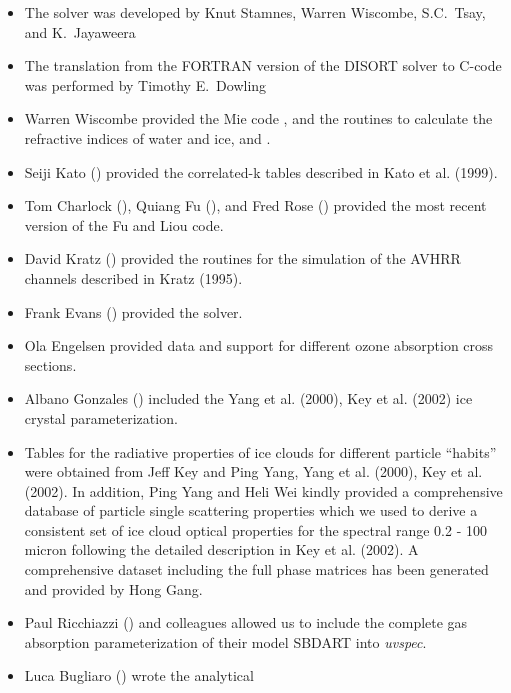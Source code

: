 \begin{itemize}
\item The  solver was developed by Knut Stamnes, Warren Wiscombe, 
  S.C.~Tsay, and K.~Jayaweera
\item The translation from the FORTRAN version of the DISORT solver to C-code was performed by Timothy E.~Dowling
\item Warren Wiscombe provided the Mie code , and the routines to calculate
  the refractive indices of water and ice,  and .
\item Seiji Kato () provided the 
  correlated-k tables described in Kato et al. (1999).
\item Tom Charlock (), Quiang Fu 
  (), 
  and Fred Rose () provided the most recent version 
  of the Fu and Liou code.
\item David Kratz () provided the routines 
  for the simulation of the AVHRR channels described in 
  Kratz (1995).
\item Frank Evans () provided the
   solver.
\item Ola Engelsen provided data and support for different ozone 
absorption cross sections.
\item Albano Gonzales () included the Yang et
  al. (2000), Key et al. (2002) ice crystal parameterization. 
\item Tables for the radiative properties of ice clouds for different
  particle ``habits'' were obtained from Jeff Key and Ping Yang,
  Yang et al. (2000), Key et al. (2002). In addition, Ping Yang and 
  Heli Wei kindly provided a comprehensive database of particle 
  single scattering properties which we used to derive a consistent 
  set of ice cloud optical properties for the spectral range 0.2 - 100 micron 
  following the detailed description in Key et al. (2002).
  A comprehensive dataset including the full phase matrices has been 
  generated and provided by Hong Gang. 
\item Paul Ricchiazzi () and colleagues
  allowed us to include the complete gas absorption parameterization 
  of their model SBDART into {\sl uvspec}.
\item Luca Bugliaro () wrote the analytical 

\end{itemize}
